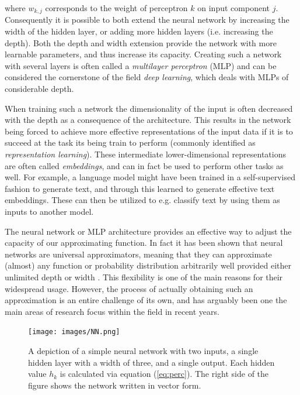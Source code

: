 \documentclass{article}
\begin{document}
where $w_{k,j}$ corresponds to the weight of perceptron $k$ on input component $j$. Consequently it is possible to both extend the neural network by increasing the width of the hidden layer, or adding more hidden layers (i.e. increasing the depth). Both the depth and width extension provide the network with more learnable parameters, and thus increase its capacity. Creating such a network with several layers is often called a \textit{multilayer perceptron} (MLP) and can be considered the cornerstone of the field \textit{deep learning}, which deals with MLPs of considerable depth.

When training such a network the dimensionality of the input is often decreased with the depth as a consequence of the architecture. This results in the network being forced to achieve more effective representations of the input data if it is to succeed at the task its being train to perform (commonly identified as \textit{representation learning}). These intermediate lower-dimensional representations are often called \textit{embeddings}, and can in fact be used to perform other tasks as well. For example, a language model might have been trained in a self-supervised fashion to generate text, and through this learned to generate effective text embeddings. These can then be utilized to e.g. classify text by using them as inputs to another model.

The neural network or MLP architecture provides an effective way to adjust the capacity of our approximating function. In fact it has been shown that neural networks are universal approximators, meaning that they can approximate (almost) any function or probability distribution arbitrarily well provided either unlimited depth or width \cite{hornik1989multilayer, lu2020universal}. This flexibility is one of the main reasons for their widespread usage. However, the process of actually obtaining such an approximation is an entire challenge of its own, and has arguably been one the main areas of research focus within the field in recent years.


\begin{figure}[H]
    \centering
    \texttt{[image: images/NN.png]}
    \caption{\onehalfspacing A depiction of a simple neural network with two inputs, a single hidden layer with a width of three, and a single output. Each hidden value $h_k$ is calculated via equation (\ref{eq:perc}). The right side of the figure shows the network written in vector form.}
    \label{fig:NN}
\end{figure}
\end{document}
